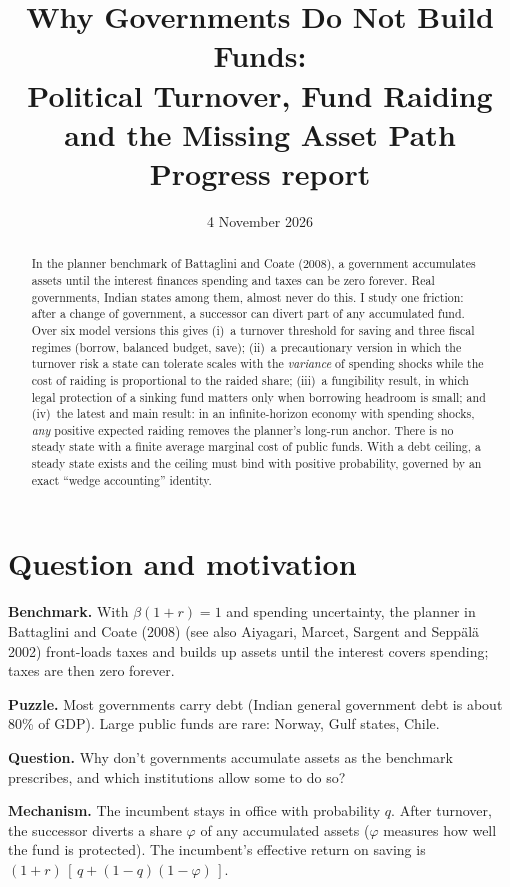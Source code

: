\documentclass[11pt]{article}
\title{Why Governments Do Not Build Funds:\\ Political Turnover, Fund Raiding and the Missing Asset Path\\[4pt] \large Progress report}
\date{4 November 2026}
\begin{document}
\maketitle

\begin{abstract}
\noindent In the planner benchmark of Battaglini and Coate (2008), a government accumulates assets until the interest finances spending and taxes can be zero forever. Real governments, Indian states among them, almost never do this. I study one friction: after a change of government, a successor can divert part of any accumulated fund. Over six model versions this gives (i)~a turnover threshold for saving and three fiscal regimes (borrow, balanced budget, save); (ii)~a precautionary version in which the turnover risk a state can tolerate scales with the \emph{variance} of spending shocks while the cost of raiding is proportional to the raided share; (iii)~a fungibility result, in which legal protection of a sinking fund matters only when borrowing headroom is small; and (iv)~the latest and main result: in an infinite-horizon economy with spending shocks, \emph{any} positive expected raiding removes the planner's long-run anchor. There is no steady state with a finite average marginal cost of public funds. With a debt ceiling, a steady state exists and the ceiling must bind with positive probability, governed by an exact ``wedge accounting'' identity.
\end{abstract}

\section{Question and motivation}

\textbf{Benchmark.} With $\beta(1+r)=1$ and spending uncertainty, the planner in Battaglini and Coate (2008) (see also Aiyagari, Marcet, Sargent and Sepp\"al\"a 2002) front-loads taxes and builds up assets until the interest covers spending; taxes are then zero forever.

\textbf{Puzzle.} Most governments carry debt (Indian general government debt is about 80\% of GDP). Large public funds are rare: Norway, Gulf states, Chile.

\textbf{Question.} Why don't governments accumulate assets as the benchmark prescribes, and which institutions allow some to do so?

\textbf{Mechanism.} The incumbent stays in office with probability $q$. After turnover, the successor diverts a share $\varphi$ of any accumulated assets ($\varphi$ measures how well the fund is protected). The incumbent's effective return on saving is $(1+r)\,[\,q+(1-q)(1-\varphi)\,]$.
\end{document}
